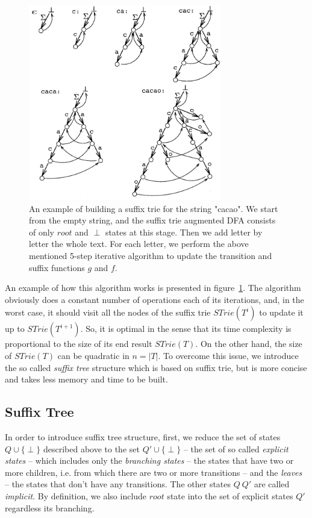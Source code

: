 \documentclass[paper=a4, fontsize=11pt]{scrartcl} %
\numberwithin{equation}{section} %
\numberwithin{figure}{section} %
\numberwithin{table}{section} %
\begin{document}
\begin{figure}[h!]
\centering
\includegraphics[width=0.75\textwidth]{figures/suffix-trie-eg.png}
\caption{An example of building a suffix trie for the string "cacao". We start from the empty string, and the suffix trie augmented DFA consists of only $root$ and $\perp$ states at this stage. Then we add letter by letter the whole text. For each letter, we perform the above mentioned 5-step iterative algorithm to update the transition and suffix functions $g$ and $f$.}
\label{fig:siffix-trie}
\end{figure}

An example of how this algorithm works is presented in figure~\ref{fig:siffix-trie}. The algorithm obviously does a constant number of operations each of its iterations, and, in the worst case, it should visit all the nodes of the suffix trie $STrie(T^i)$ to update it up to $STrie(T^{i+1})$. So, it is optimal in the sense that its time complexity is proportional to the size of its end result $STrie(T)$. On the other hand, the size of $STrie(T)$ can be quadratic in $n = |T|$. To overcome this issue, we introduce the so called \textit{suffix tree} structure which is based on suffix trie, but is more concise and takes less memory and time to be built.

\subsection{Suffix Tree}
In order to introduce suffix tree structure, first, we reduce the set of states $Q \cup \{\perp\}$ described above to the set $Q' \cup \{\perp\}$ -- the set of so called \textit{explicit states} -- which includes only the \textit{branching states} -- the states that have two or more children, i.e. from which there are two or more transitions -- and the \textit{leaves} -- the states that don't have any transitions. The other states $Q \ Q'$ are called \textit{implicit}. By definition, we also include $root$ state into the set of explicit states $Q'$ regardless its branching.
\end{document}
